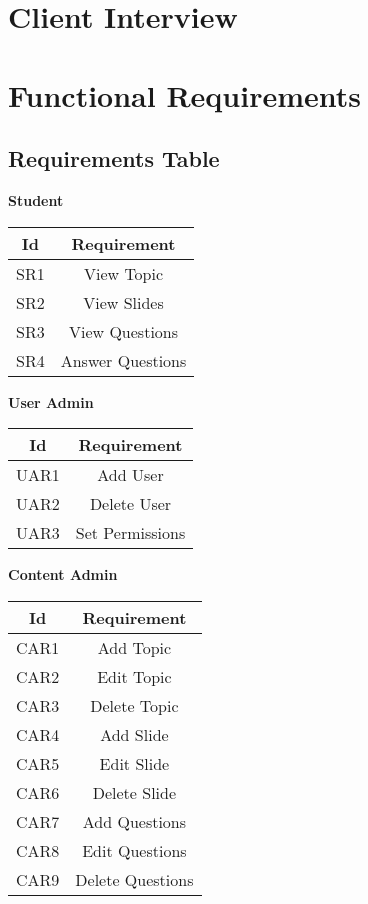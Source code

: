 \documentclass{l3proj}
\begin{document}
\section{Client Interview}



\section{Functional Requirements}

\subsection{Requirements Table}

\textbf{Student}\\

\begin{center}
\begin{tabular}{|c|c|}
\hline \textbf{Id} & \textbf{Requirement}\\
\hline SR1 & View Topic\\
\hline SR2 & View Slides\\
\hline SR3 & View Questions\\
\hline SR4 & Answer Questions\\
\hline 
\end{tabular}
\end{center}

\textbf{User Admin}\\

\begin{center}
\begin{tabular}{|c|c|}
\hline \textbf{Id} & \textbf{Requirement}\\
\hline UAR1 & Add User\\
\hline UAR2 & Delete User\\
\hline UAR3 & Set Permissions\\
\hline 
\end{tabular}
\end{center}

\textbf{Content Admin}\\

\begin{center}
\begin{tabular}{|c|c|}
\hline \textbf{Id} & \textbf{Requirement}\\
\hline CAR1 & Add Topic\\
\hline CAR2 & Edit Topic\\
\hline CAR3 & Delete Topic\\
\hline CAR4 & Add Slide\\
\hline CAR5 & Edit Slide\\
\hline CAR6 & Delete Slide\\
\hline CAR7 & Add Questions\\
\hline CAR8 & Edit Questions\\
\hline CAR9 & Delete Questions\\
\hline 
\end{tabular}
\end{center}
\end{document}
